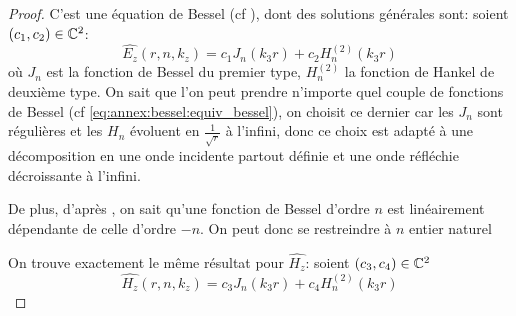 \begin{proof}
        C'est une équation de Bessel (cf \cite[eq (6.80)]{bowman_introduction_1958}), dont des solutions générales sont: soient \((c_1,c_2) \in \mathbb C^2\):
       \begin{equation}
            \hat{E_z}(r,n,k_z) = c_1 J_n\left(k_3r\right) + c_2 H_n^{(2)}\left(k_3r\right)
        \end{equation}
        où \(J_n\) est la fonction de Bessel du premier type, \(H_n^{(2)}\) la fonction de Hankel de deuxième type.
        On sait que l'on peut prendre n'importe quel couple de fonctions de Bessel (cf \eqref{eq:annex:bessel:equiv_bessel}), on choisit ce dernier car les \(J_n\) sont régulières et les \(H_n\) évoluent en \(\frac{1}{\sqrt{r}}\) à l'infini, donc ce choix est adapté à une décomposition en une onde incidente partout définie et une onde réfléchie décroissante à l'infini.

        De plus, d'après \cite[p.~358]{abramowitz_handbook_1964}, on sait qu'une fonction de Bessel d'ordre \(n\) est linéairement dépendante de celle d'ordre \(-n\).
        On peut donc se restreindre à \(n\) entier naturel

        On trouve exactement le même résultat pour \(\hat{H_z}\): soient \((c_3,c_4) \in \mathbb C^2\)
        \begin{equation}
            \hat{H_z}(r,n,k_z) = c_3 J_n\left(k_3r\right) + c_4 H_n^{(2)}\left(k_3r\right)
        \end{equation}
    \end{proof}


    \newcommand{\mJ}{\mat{J}}
    \newcommand{\mH}{\mat{H}}

